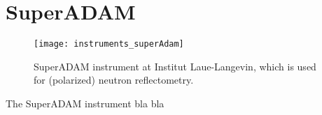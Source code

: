 \documentclass[\main/dresen_thesis.tex]{subfiles}
\begin{document}
\section{SuperADAM}\label{ch:appendix:lss:superadam}
\begin{figure}[h]
  \centering
  \texttt{[image: instruments\_superAdam]}
  \caption{\label{fig:appendix:lss:superadam}SuperADAM instrument at Institut Laue-Langevin, which is used for (polarized) neutron reflectometry.}
\end{figure}
The SuperADAM instrument bla bla
\end{document}
